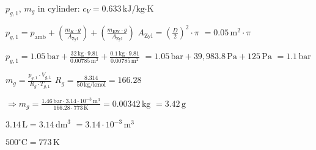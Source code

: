 \( p_{g,1} \), \( m_g \) in cylinder:  
\( c_V = 0.633 \, \text{kJ/kg·K} \)  

\( p_{g,1} = p_{\text{amb}} + \left( \frac{m_K \cdot g}{A_{\text{Zyl}}} \right) + \left( \frac{m_{\text{EW}} \cdot g}{A_{\text{Zyl}}} \right) \)  
\( A_{\text{Zyl}} = \left( \frac{D}{2} \right)^2 \cdot \pi \)  
\( = 0.05 \, \text{m}^2 \cdot \pi \)  

\( p_{g,1} = 1.05 \, \text{bar} + \frac{32 \, \text{kg} \cdot 9.81}{0.00785 \, \text{m}^2} + \frac{0.1 \, \text{kg} \cdot 9.81}{0.00785 \, \text{m}^2} \)  
\( = 1.05 \, \text{bar} + 39,983.8 \, \text{Pa} + 125 \, \text{Pa} \)  
\( = 1.1 \, \text{bar} \)  

\( m_g = \frac{p_{g,1} \cdot V_{g,1}}{R_g \cdot T_{g,1}} \)  
\( R_g = \frac{8.314}{50 \, \text{kg/kmol}} = 166.28 \)  

\( \Rightarrow m_g = \frac{1.46 \, \text{bar} \cdot 3.14 \cdot 10^{-3} \, \text{m}^3}{166.28 \cdot 773 \, \text{K}} = 0.00342 \, \text{kg} \)  
\( = 3.42 \, \text{g} \)  

\( 3.14 \, \text{L} = 3.14 \, \text{dm}^3 \)  
\( = 3.14 \cdot 10^{-3} \, \text{m}^3 \)  

\( 500^\circ \text{C} = 773 \, \text{K} \)